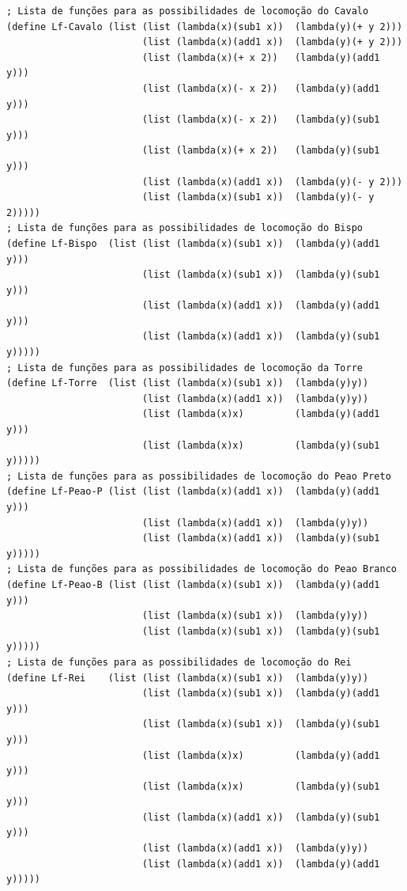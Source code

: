 \begin{Verbatim}[fontsize=\footnotesize]
; Lista de funções para as possibilidades de locomoção do Cavalo
(define Lf-Cavalo (list (list (lambda(x)(sub1 x))  (lambda(y)(+ y 2)))
                        (list (lambda(x)(add1 x))  (lambda(y)(+ y 2)))
                        (list (lambda(x)(+ x 2))   (lambda(y)(add1 y)))
                        (list (lambda(x)(- x 2))   (lambda(y)(add1 y)))
                        (list (lambda(x)(- x 2))   (lambda(y)(sub1 y)))
                        (list (lambda(x)(+ x 2))   (lambda(y)(sub1 y)))
                        (list (lambda(x)(add1 x))  (lambda(y)(- y 2)))
                        (list (lambda(x)(sub1 x))  (lambda(y)(- y 2)))))
; Lista de funções para as possibilidades de locomoção do Bispo
(define Lf-Bispo  (list (list (lambda(x)(sub1 x))  (lambda(y)(add1 y)))
                        (list (lambda(x)(sub1 x))  (lambda(y)(sub1 y)))
                        (list (lambda(x)(add1 x))  (lambda(y)(add1 y)))
                        (list (lambda(x)(add1 x))  (lambda(y)(sub1 y)))))
; Lista de funções para as possibilidades de locomoção da Torre
(define Lf-Torre  (list (list (lambda(x)(sub1 x))  (lambda(y)y))
                        (list (lambda(x)(add1 x))  (lambda(y)y))
                        (list (lambda(x)x)         (lambda(y)(add1 y)))
                        (list (lambda(x)x)         (lambda(y)(sub1 y)))))
; Lista de funções para as possibilidades de locomoção do Peao Preto
(define Lf-Peao-P (list (list (lambda(x)(add1 x))  (lambda(y)(add1 y)))
                        (list (lambda(x)(add1 x))  (lambda(y)y))
                        (list (lambda(x)(add1 x))  (lambda(y)(sub1 y)))))
; Lista de funções para as possibilidades de locomoção do Peao Branco
(define Lf-Peao-B (list (list (lambda(x)(sub1 x))  (lambda(y)(add1 y)))
                        (list (lambda(x)(sub1 x))  (lambda(y)y))
                        (list (lambda(x)(sub1 x))  (lambda(y)(sub1 y)))))
; Lista de funções para as possibilidades de locomoção do Rei
(define Lf-Rei    (list (list (lambda(x)(sub1 x))  (lambda(y)y))
                        (list (lambda(x)(sub1 x))  (lambda(y)(add1 y)))
                        (list (lambda(x)(sub1 x))  (lambda(y)(sub1 y)))
                        (list (lambda(x)x)         (lambda(y)(add1 y)))
                        (list (lambda(x)x)         (lambda(y)(sub1 y)))
                        (list (lambda(x)(add1 x))  (lambda(y)(sub1 y)))
                        (list (lambda(x)(add1 x))  (lambda(y)y))
                        (list (lambda(x)(add1 x))  (lambda(y)(add1 y)))))
\end{Verbatim}

